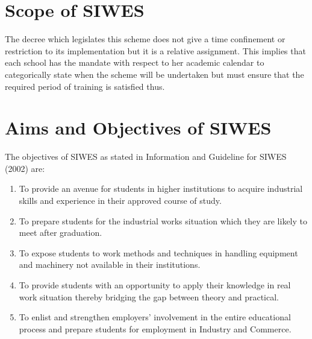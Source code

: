 \section{Scope of SIWES}


The decree which legislates this scheme does not give a time confinement or restriction to
its implementation but it is a relative assignment. This implies that each school has the mandate
with respect to her academic calendar to categorically state when the scheme will be undertaken but must ensure that the required period of training is satisfied thus. 
\section{Aims and Objectives of SIWES}


The objectives of SIWES as stated in Information and Guideline for SIWES (2002) are:
\begin{enumerate}
	\item To provide an avenue for students in higher institutions to acquire industrial skills and experience in their approved course of study.
	\item To prepare students for the industrial works situation which they are likely to meet after graduation.
	\item To expose students to work methods and techniques in handling equipment and machinery
	not available in their institutions.

	\item To provide students with an opportunity to apply their knowledge in real work situation
	thereby bridging the gap between theory and practical.
	\item To enlist and strengthen employers’ involvement in the entire educational process and
	prepare students for employment in Industry and Commerce.
\end{enumerate}

